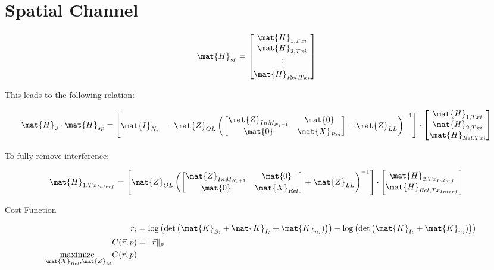 \chapter{Spatial Channel}
\label{sec:spatial_channel}

\begin{align}
\mat{H}_{sp} &= 
\begin{bmatrix}
\mat{H}_{1,Txi}\\
\mat{H}_{2,Txi}\\
\vdots\\
\mat{H}_{Rel,Txi}
\end{bmatrix}
\end{align}

This leads to the following relation:

\begin{align}
\mat{H}_0\cdot \mat{H}_{sp} &= 
\begin{bmatrix}
\mat{I}_{N_i} & -\mat{Z}_{OL}\left(
\begin{bmatrix}
\mat{Z}_{InM_{N_i+1}} & \mat{0}\\
\mat{0} & \mat{X}_{Rel}
\end{bmatrix}
 + \mat{Z}_{LL}\right)^{-1}
\end{bmatrix}
\cdot
\begin{bmatrix}
\mat{H}_{1,Txi}\\
\mat{H}_{2,Txi}\\
\mat{H}_{Rel,Txi}
\end{bmatrix}
\end{align}

To fully remove interference:


\begin{align}
\mat{H}_{1,Tx_{Interf}} &= \left[\mat{Z}_{OL}\left(
\begin{bmatrix}
\mat{Z}_{InM_{N_i+1}} & \mat{0}\\
\mat{0} & \mat{X}_{Rel}
\end{bmatrix}
 + \mat{Z}_{LL}\right)^{-1}\right]\cdot
\begin{bmatrix}
\mat{H}_{2,Tx_{Interf}}\\
\mat{H}_{Rel,Tx_{Interf}}
\end{bmatrix}
\end{align}


Cost Function

\begin{align}
r_i &= \log\left(\det\left(\mat{K}_{S_i} + \mat{K}_{I_i} + \mat{K}_{n_i})\right)\right) - \log\left(\det\left(\mat{K}_{I_i} + \mat{K}_{n_i})\right)\right)\\
C(\vec{r},p) &= \|\vec{r}\|_p \\
\underset{\mat{X}_{Rel},\mat{Z}_M}{\text{maximize }} C(\vec{r},p)
\end{align}

